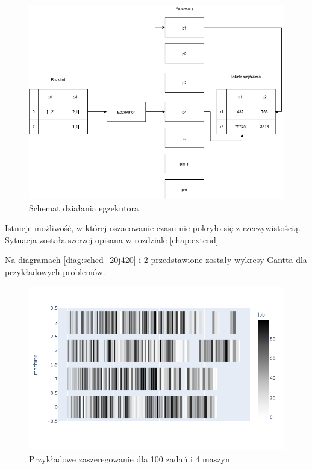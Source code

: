 \documentclass[brudnopis]{xmgr}
\begin{document}
\begin{figure}[!tbh]
\centering
\includegraphics[width=.8\hsize]{fig/executor.png}
\caption{Schemat działania egzekutora\label{diag:executor}}
\end{figure}
\medskip

Istnieje możliwość, w której oszacowanie czasu nie pokryło się z rzeczywistością. Sytuacja została szerzej opisana w rozdziale \ref{chap:extend}

Na diagramach \ref{diag:sched_20j420} i \ref{diag:sched_100j4m} przedstawione zostały wykresy Gantta dla przykładowych problemów.

\begin{figure}[!tbh]
\centering
\includegraphics[width=.8\hsize]{fig/newplot_trim100j4m.png}
\caption{Przykładowe zaszeregowanie dla 100 zadań i 4 maszyn\label{diag:sched_100j4m}}
\end{figure}
\medskip
\end{document}
